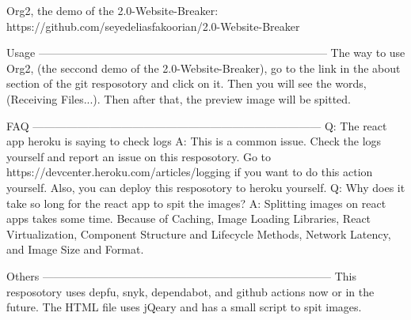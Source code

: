 Org2, the demo of the 2.0-Website-Breaker:
https://github.com/seyedeliasfakoorian/2.0-Website-Breaker

Usage
------------------------------------------------------------------------------
The way to use Org2, (the seccond demo of the 2.0-Website-Breaker), 
go to the link in the about section of the git resposotory and click on
it. Then you will see the words, (Receiving Files...). Then after that, 
the preview image will be spitted.

FAQ
------------------------------------------------------------------------------
Q: The react app heroku is saying to check logs
A: This is a common issue. Check the logs yourself and report an issue
   on this resposotory. Go to https://devcenter.heroku.com/articles/logging
   if you want to do this action yourself. Also, you can deploy this 
   resposotory to heroku yourself.
Q: Why does it take so long for the react app to spit the images?
A: Splitting images on react apps takes some time. Because of Caching,
   Image Loading Libraries, React Virtualization,
   Component Structure and Lifecycle Methods, Network Latency, and
   Image Size and Format.

Others
------------------------------------------------------------------------------
This resposotory uses depfu, snyk, dependabot, and github actions now
or in the future.
The HTML file uses jQeary and has a small script to spit images.
